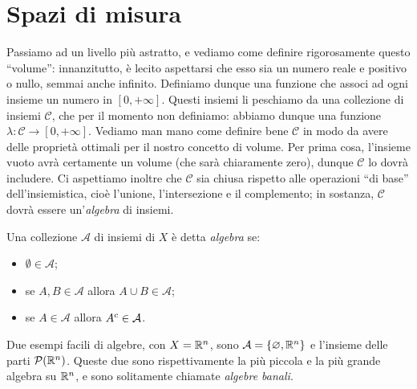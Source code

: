 \section{Spazi di misura}
Passiamo ad un livello più astratto, e vediamo come definire rigorosamente questo ``volume'': innanzitutto, è lecito aspettarsi che esso sia un numero reale e positivo o nullo, semmai anche infinito.
Definiamo dunque una funzione che associ ad ogni insieme un numero in $[0,+\infty]$.
Questi insiemi li peschiamo da una collezione di insiemi $\mathcal C$, che per il momento non definiamo: abbiamo dunque una funzione $\lambda\colon\mathcal C\to[0,+\infty]$.
Vediamo man mano come definire bene $\mathcal C$ in modo da avere delle proprietà ottimali per il nostro concetto di volume.
Per prima cosa, l'insieme vuoto avrà certamente un volume (che sarà chiaramente zero), dunque $\mathcal C$ lo dovrà includere.
Ci aspettiamo inoltre che $\mathcal C$ sia chiusa rispetto alle operazioni ``di base'' dell'insiemistica, cioè l'unione, l'intersezione e il complemento; in sostanza, $\mathcal C$ dovrà essere un'\emph{algebra} di insiemi.
\begin{definizione} \label{d:algebra}
	Una collezione $\mathcal A$ di insiemi di $X$ è detta \emph{algebra} se:
	\begin{itemize}
		\item $\emptyset\in\mathcal A$;
		\item se $A,B\in\mathcal A$ allora $A\cup B\in\mathcal A$;
		\item se $A\in\mathcal A$ allora ${A}^c\in\mathcal A$.
	\end{itemize}
\end{definizione}
Due esempi facili di algebre, con $X=\mathbb{R}^n$, sono $\mathcal A=\{\varnothing,\mathbb{R}^n\}$ e l'insieme delle parti $\mathcal P(\mathbb{R}^n)$.
Queste due sono rispettivamente la più piccola e la più grande algebra su $\mathbb{R}^n$, e sono solitamente chiamate \emph{algebre banali}.

